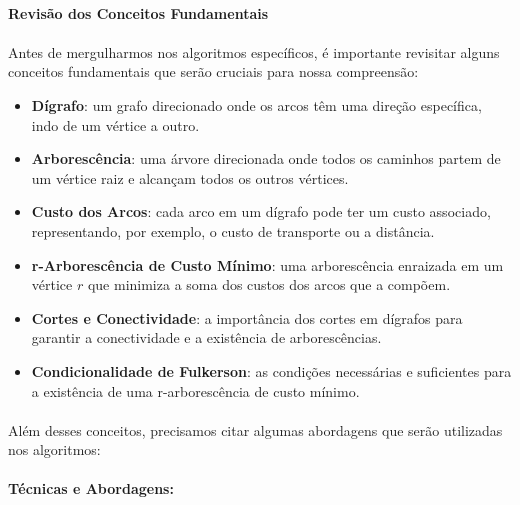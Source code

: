 \documentclass[12pt,a4paper]{article}
\begin{document}
\paragraph{Revisão dos Conceitos Fundamentais}
\paragraph{}
Antes de mergulharmos nos algoritmos específicos, é importante revisitar alguns conceitos fundamentais que serão cruciais para nossa compreensão:
\begin{itemize}\setlength{\itemsep}{2pt}
    \item \textbf{Dígrafo}: um grafo direcionado onde os arcos têm uma direção específica, indo de um vértice a outro.
    \item \textbf{Arborescência}: uma árvore direcionada onde todos os caminhos partem de um vértice raiz e alcançam todos os outros vértices.
    \item \textbf{Custo dos Arcos}: cada arco em um dígrafo pode ter um custo associado, representando, por exemplo, o custo de transporte ou a distância.
    \item \textbf{r-Arborescência de Custo Mínimo}: uma arborescência enraizada em um vértice \(r\) que minimiza a soma dos custos dos arcos que a compõem.
    \item \textbf{Cortes e Conectividade}: a importância dos cortes em dígrafos para garantir a conectividade e a existência de arborescências.
    \item \textbf{Condicionalidade de Fulkerson}: as condições necessárias e suficientes para a existência de uma r-arborescência de custo mínimo.
\end{itemize}

\paragraph{}
Além desses conceitos, precisamos citar algumas abordagens que serão utilizadas nos algoritmos:

\paragraph{Técnicas e Abordagens:}
\end{document}
